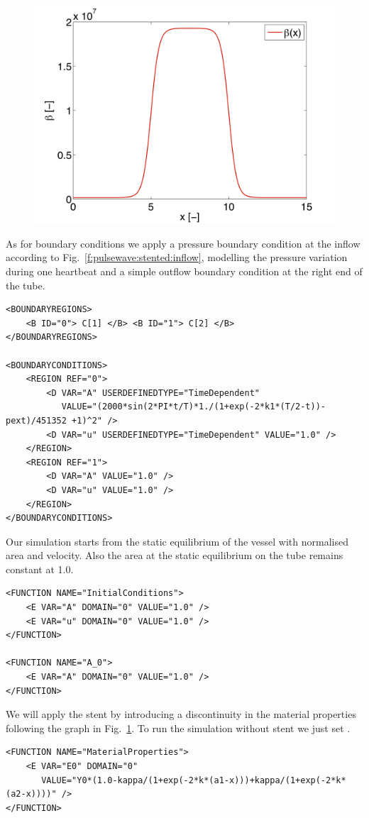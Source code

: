 \begin{figure}
	\centering
	\includegraphics[width=0.49\linewidth]{Figures/betax.png}
	\caption{}
	\label{f:pulsewave:stented:betax}
\end{figure}

As for boundary conditions we apply a pressure boundary condition at the inflow
according to Fig.~\ref{f:pulsewave:stented:inflow}, modelling the pressure
variation during one heartbeat and a simple outflow boundary condition at the
right end of the tube.
\begin{lstlisting}[style=XmlStyle]
<BOUNDARYREGIONS>
    <B ID="0"> C[1] </B> <B ID="1"> C[2] </B>
</BOUNDARYREGIONS>

<BOUNDARYCONDITIONS>
    <REGION REF="0">
        <D VAR="A" USERDEFINEDTYPE="TimeDependent" 
           VALUE="(2000*sin(2*PI*t/T)*1./(1+exp(-2*k1*(T/2-t))-pext)/451352 +1)^2" /> 
        <D VAR="u" USERDEFINEDTYPE="TimeDependent" VALUE="1.0" />
    </REGION>
    <REGION REF="1">
        <D VAR="A" VALUE="1.0" />
        <D VAR="u" VALUE="1.0" />
    </REGION>
</BOUNDARYCONDITIONS>
\end{lstlisting}

Our simulation starts from the static equilibrium of the vessel with normalised
area and velocity. Also the area at the static equilibrium on the tube remains
constant at 1.0.
\begin{lstlisting}[style=XmlStyle]
<FUNCTION NAME="InitialConditions">
    <E VAR="A" DOMAIN="0" VALUE="1.0" /> 
    <E VAR="u" DOMAIN="0" VALUE="1.0" />
</FUNCTION>

<FUNCTION NAME="A_0">
    <E VAR="A" DOMAIN="0" VALUE="1.0" />
</FUNCTION>
\end{lstlisting}

We will apply the stent by introducing a discontinuity in the material
properties following the graph in Fig.~\ref{f:pulsewave:stented:betax}. To run
the simulation without stent we just set .
\begin{lstlisting}[style=XMLStyle]
<FUNCTION NAME="MaterialProperties"> 
    <E VAR="E0" DOMAIN="0" 
       VALUE="Y0*(1.0-kappa/(1+exp(-2*k*(a1-x)))+kappa/(1+exp(-2*k*(a2-x))))" />
</FUNCTION>
\end{lstlisting}

